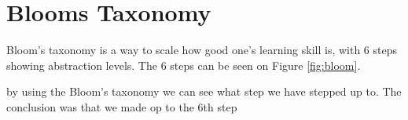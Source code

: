\section{Blooms Taxonomy}
Bloom's taxonomy is a way to scale how good one's learning skill is, with 6 steps showing abstraction levels.
The 6 steps can be seen on Figure \ref{fig:bloom}.



by using the Bloom's taxonomy we can see what step we have stepped up to. The conclusion was that we made op to the 6th step 